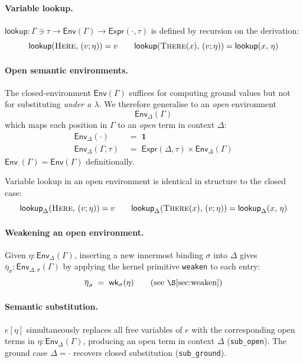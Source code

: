\documentclass[10pt,a4paper]{article}
\newcommand{\inctx}[2]{#1 \ni #2}               %
\newcommand{\subst}[2]{#1[#2]}
\newcommand{\SemEnv}[1]{\mathsf{Env}(#1)}
\newcommand{\SemEnvD}[2]{\mathsf{Env}_{#1}(#2)}
\theoremstyle{plain}
\theoremstyle{definition}
\theoremstyle{remark}
\begin{document}
\paragraph{Variable lookup.}
$\mathsf{lookup} : \inctx{\Gamma}{\tau} \to \SemEnv{\Gamma} \to \mathsf{Expr}(\cdot,\tau)$
is defined by recursion on the derivation:
\[
  \mathsf{lookup}(\textsc{Here},\,(v;\eta)) = v
  \qquad
  \mathsf{lookup}(\textsc{There}(x),\,(v;\eta)) = \mathsf{lookup}(x,\,\eta)
\]

\paragraph{Open semantic environments.}
The closed-environment $\SemEnv{\Gamma}$ suffices for computing ground values
but not for substituting \emph{under a $\lambda$}.
We therefore generalise to an \emph{open} environment
\[
  \SemEnvD{\Delta}{\Gamma}
\]
which maps each position in $\Gamma$ to an \emph{open} term in context $\Delta$:
\begin{align*}
\SemEnvD{\Delta}{\cdot}           &\;=\; \mathbf{1}\\
\SemEnvD{\Delta}{\Gamma,\tau}     &\;=\; \mathsf{Expr}(\Delta,\tau)\times\SemEnvD{\Delta}{\Gamma}
\end{align*}
$\SemEnvD{\cdot}{\Gamma} = \SemEnv{\Gamma}$ definitionally.

Variable lookup in an open environment is identical in structure to the
closed case:
\[
  \mathsf{lookup}_\Delta(\textsc{Here},\,(v;\eta)) = v
  \qquad
  \mathsf{lookup}_\Delta(\textsc{There}(x),\,(v;\eta)) = \mathsf{lookup}_\Delta(x,\,\eta)
\]

\paragraph{Weakening an open environment.}
Given $\eta : \SemEnvD{\Delta}{\Gamma}$, inserting a new innermost binding
$\sigma$ into $\Delta$ gives $\overline{\eta}_\sigma : \SemEnvD{\Delta,\sigma}{\Gamma}$
by applying the kernel primitive \texttt{weaken} to each entry:
\[
  \overline{\eta}_\sigma \;=\; \mathsf{wk}_\sigma(\eta)
  \qquad\text{(see \S\ref{sec:weaken})}
\]

\paragraph{Semantic substitution.}
$\subst{e}{\eta}$ simultaneously replaces all free variables of $e$ with
the corresponding open terms in $\eta : \SemEnvD{\Delta}{\Gamma}$, producing
an open term in context $\Delta$ (\texttt{sub\_open}).
The ground case $\Delta = \cdot$ recovers closed substitution (\texttt{sub\_ground}).
\end{document}
